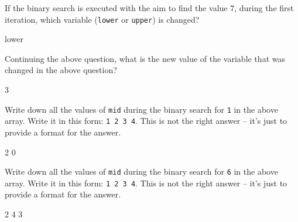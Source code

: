 \nextq
If the binary search is executed with the aim to find the value $7$,
during the first iteration, which variable (\verb!lower! or \verb!upper!)
is changed?
\\
\ANSWER
\begin{answercode}
lower
\end{answercode}

\nextq
Continuing the above question, what is the new value of the variable that
was changed in the above question?
\\
\ANSWER
\begin{answercode}
3
\end{answercode}

\nextq
Write down all the values of \verb!mid! during the binary search
for \verb!1! in the above array.
Write it in this form: \verb!1 2 3 4!.
This is not the right answer -- it's just to provide a format for the answer.
\\
\ANSWER
\begin{answercode}
2 0
\end{answercode}

\nextq
Write down all the values of \verb!mid! during the binary search
for \verb!6! in the above array.
Write it in this form: \verb!1 2 3 4!.
This is not the right answer -- it's just to provide a format for the answer.
\\
\ANSWER
\begin{answercode}
2 4 3
\end{answercode}


